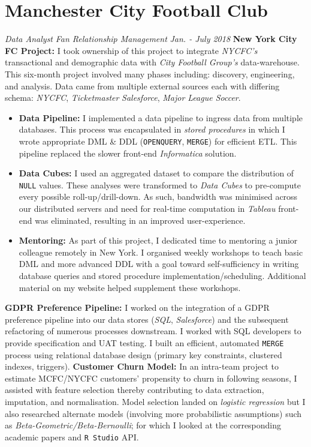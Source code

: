 \documentclass[letterpaper,11pt]{article}
\begin{document}
\section{Manchester City Football Club}
\textit{Data Analyst}
\hfill
\textit{Fan Relationship Management}
\hfill
\textit{Jan. - July 2018}
\newline \newline
\textbf{New York City FC Project:}
I took ownership of this project to integrate \textit{NYCFC's} transactional and demographic data with \textit{City Football Group's} data-warehouse. This six-month project involved many phases including: discovery, engineering, and analysis. Data came from multiple external sources each with differing schema: \textit{NYCFC}, \textit{Ticketmaster} \textit{Salesforce}, \textit{Major League Soccer}.
\begin{itemize}
	\item
	      {
	      \textbf{Data Pipeline:}
	      I implemented a data pipeline to ingress data from multiple databases.
	      This process was encapsulated in \textit{stored procedures} in which I wrote appropriate DML \& DDL (\texttt{OPENQUERY}, \texttt{MERGE}) for efficient ETL.
	      This pipeline replaced the slower front-end  \textit{Informatica} solution.
	      }
	\item
	      {
	      \textbf{Data Cubes:}
	      I used an aggregated dataset to compare the distribution of \texttt{NULL} values. These analyses were transformed to \textit{Data Cubes} to pre-compute every possible roll-up/drill-down. As such, bandwidth was minimised across our distributed servers and need for real-time computation in \textit{Tableau} front-end was eliminated, resulting in an improved user-experience.
	      }
	\item
	      {
	      \textbf{Mentoring:}
	      As part of this project, I dedicated time to mentoring a junior colleague remotely in New York. I organised weekly workshops to teach basic DML and more advanced DDL with a goal toward self-sufficiency in writing database queries and stored procedure implementation/scheduling. Additional material on my website helped supplement these workshops.
	      }
\end{itemize}
\noindent
\textbf{GDPR Preference Pipeline:}
I worked on the integration of a GDPR preference pipeline into our data stores (\textit{SQL}, \textit{Salesforce}) and the subsequent refactoring of numerous processes downstream.
I worked with SQL developers to provide specification and UAT testing. I built an efficient, automated \texttt{MERGE} process using relational database design (primary key constraints, clustered indexes, triggers).
\newline \newline
\noindent
\textbf{Customer Churn Model:}
In an intra-team project to estimate MCFC/NYCFC customers' propensity to churn in following seasons, I assisted with feature selection thereby contributing to data extraction, imputation, and normalisation. Model selection landed on \textit{logistic regression} but I also researched alternate models (involving more probabilistic assumptions) such as \textit{Beta-Geometric/Beta-Bernoulli}; for which I looked at the corresponding academic papers and \texttt{R Studio} API.
\end{document}
